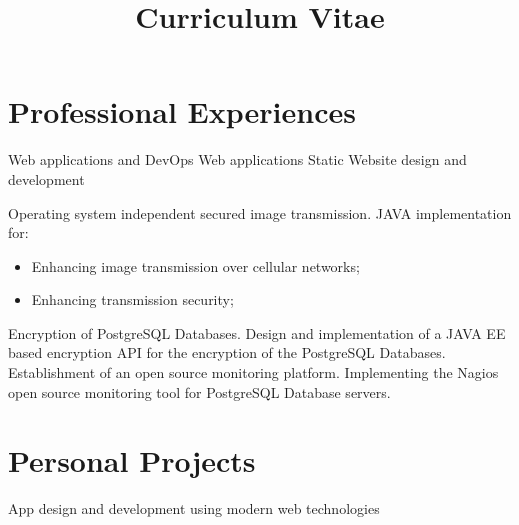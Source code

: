 \documentclass[11pt,a4paper,sans]{moderncv}        %
\title{Curriculum Vitae}                               %
\begin{document}
	\makecvtitle

	\section{Professional Experiences}
				{ Web applications and DevOps }
				{ Web applications }
				{ Static Website design and development }
				{Operating system independent secured image transmission.\newline{}%
					JAVA implementation for:%
					\begin{itemize}%
						\item Enhancing image transmission over cellular networks;
						\item Enhancing transmission security;
					\end{itemize}
				}
				{Encryption of PostgreSQL Databases.
				\newline{}
				Design and implementation of a JAVA EE based encryption API for the encryption of the
					PostgreSQL Databases.
				}
				{Establishment of an open source monitoring platform. 
				\newline{}
				Implementing the Nagios open source monitoring tool for PostgreSQL Database servers.
				}
    \section{Personal Projects}
				{ App design and development using modern web technologies }
\end{document}
